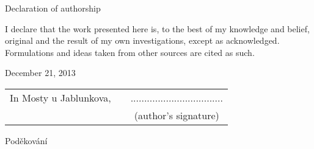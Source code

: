 \newcommand{\odsaditodzhora}{\hskip1pt\vfill}

\odsaditodzhora
\noindent Declaration of authorship

I declare that the work presented here is, to the best of my knowledge and
belief, original and the result of my own investigations, except as acknowledged.
Formulations and ideas taken from other sources are cited as such.

December 21, 2013

\begin{flushleft}
\begin{tabular}{cp{}c}
In Mosty u Jablunkova, 
& 
&
..................................
\\
&&
(author’s signature)
\end{tabular}

\end{flushleft}
\newpage


\odsaditodzhora
\noindent Poděkování


\newpage
